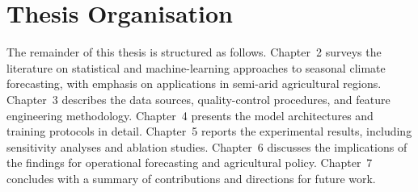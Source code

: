 \section{Thesis Organisation}

The remainder of this thesis is structured as follows. Chapter~2 surveys the
literature on statistical and machine-learning approaches to seasonal climate
forecasting, with emphasis on applications in semi-arid agricultural regions.
Chapter~3 describes the data sources, quality-control procedures, and feature
engineering methodology. Chapter~4 presents the model architectures and
training protocols in detail. Chapter~5 reports the experimental results,
including sensitivity analyses and ablation studies. Chapter~6 discusses the
implications of the findings for operational forecasting and agricultural
policy. Chapter~7 concludes with a summary of contributions and directions for
future work.
